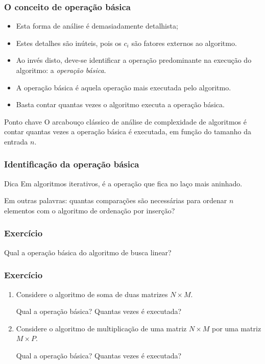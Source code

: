 \documentclass{beamer}
\begin{document}
\begin{frame}
\frametitle{O conceito de operação básica}

\begin{itemize}
\item Esta forma de análise é demasiadamente detalhista;
\item Estes detalhes são inúteis, pois os $c_i$ são fatores externos ao
  algoritmo.
\item Ao invés disto, deve-se identificar a operação predominante na execução
  do algoritmo: a \emph{operação básica}.
\item A operação básica é aquela operação mais executada pelo algoritmo.
\item Basta contar quantas vezes o algoritmo executa a operação básica.
\end{itemize}
\begin{block}{Ponto chave}
O arcabouço clássico de análise de complexidade de algoritmos é contar quantas vezes a operação básica é executada, em função do tamanho da entrada $n$.
\end{block}
\end{frame}

\begin{frame}
\frametitle{Identificação da operação básica}

\begin{block}{Dica}
Em algoritmos iterativos, é a operação que fica no laço mais aninhado.
\end{block}

\pause



  Em outras palavras: quantas comparações são necessárias para ordenar $n$
  elementos com o algoritmo de ordenação por inserção?

\end{frame}

\begin{frame}
  \frametitle{Exercício}

Qual a operação básica do algoritmo de busca linear?


\end{frame}

\begin{frame}
  \frametitle{Exercício}

  \begin{enumerate}
  \item Considere o algoritmo de soma de duas matrizes $N \times M$.

    Qual a operação básica? Quantas vezes é executada?
  \item Considere o algoritmo de multiplicação de uma matriz $N \times M$ 
    por uma matriz $M \times P$.

    Qual a operação básica? Quantas vezes é executada?
  \end{enumerate}

\end{frame}
\end{document}
